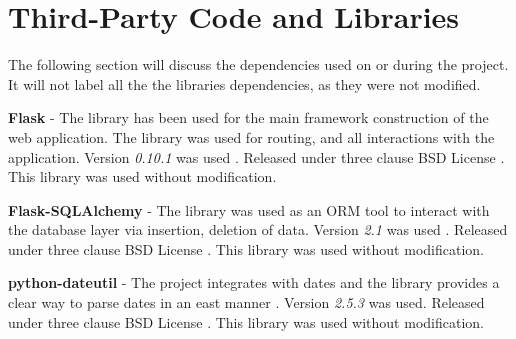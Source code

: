   \chapter{Third-Party Code and Libraries}







The following section will discuss the dependencies used on or during the project. It will not label all the the libraries dependencies, as they were not modified.

\textbf{Flask} - The library has been used for the main framework construction of the web application. The library was used for routing, and all interactions with the application. Version \textit{0.10.1} was used \cite{citeulike:13160396}. Released under three clause BSD License \cite{citeulike:14025861}. This library was used without modification.

\textbf{Flask-SQLAlchemy} - The library was used as an ORM tool to interact with the database layer via insertion, deletion of data. Version \textit{2.1} was used \cite{citeulike:14025864}. Released under three clause BSD License \cite{citeulike:14025861}. This library was used without modification.

\textbf{python-dateutil} - The project integrates with dates and the library provides a clear way to parse dates in an east manner \cite{citeulike:14025869}. Version \textit{2.5.3} was used. Released under three clause BSD License \cite{citeulike:14025861}. This library was used without modification.

